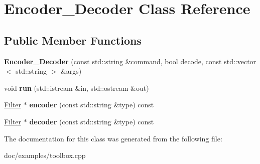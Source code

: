 \hypertarget{classEncoder__Decoder}{\section{Encoder\-\_\-\-Decoder Class Reference}
\label{classEncoder__Decoder}
}
\subsection*{Public Member Functions}
\begin{DoxyCompactItemize}
\item 
\hypertarget{classEncoder__Decoder_ad8432f408fed7b8ecca1466b716fb25e}{{\bfseries Encoder\-\_\-\-Decoder} (const std\-::string \&command, bool decode, const std\-::vector$<$ std\-::string $>$ \&args)}\label{classEncoder__Decoder_ad8432f408fed7b8ecca1466b716fb25e}

\item 
\hypertarget{classEncoder__Decoder_ab10a8d6075deca03668eb43481173286}{void {\bfseries run} (std\-::istream \&in, std\-::ostream \&out)}\label{classEncoder__Decoder_ab10a8d6075deca03668eb43481173286}

\item 
\hypertarget{classEncoder__Decoder_a8f33903d5ddb4cecac1528aeaef51071}{\hyperlink{classBotan_1_1Filter}{Filter} $\ast$ {\bfseries encoder} (const std\-::string \&type) const }\label{classEncoder__Decoder_a8f33903d5ddb4cecac1528aeaef51071}

\item 
\hypertarget{classEncoder__Decoder_ac58272278680a854846ce3c08e36516d}{\hyperlink{classBotan_1_1Filter}{Filter} $\ast$ {\bfseries decoder} (const std\-::string \&type) const }\label{classEncoder__Decoder_ac58272278680a854846ce3c08e36516d}

\end{DoxyCompactItemize}


The documentation for this class was generated from the following file\-:\begin{DoxyCompactItemize}
\item 
doc/examples/toolbox.\-cpp\end{DoxyCompactItemize}
